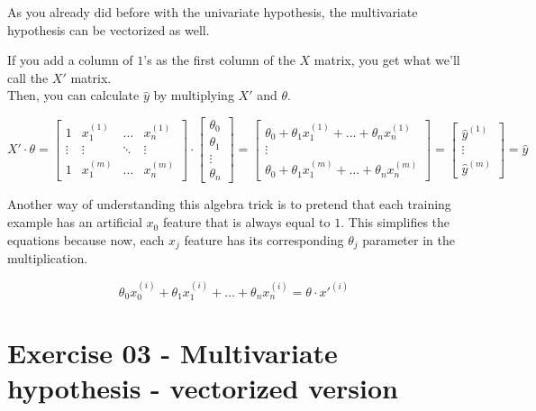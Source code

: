 \documentclass[]{article}
\begin{document}
As you already did before with the univariate hypothesis, the
multivariate hypothesis can be vectorized as well.

If you add a column of \(1\)'s as the first column of the \(X\) matrix,
you get what we'll call the \(X'\) matrix.\\
Then, you can calculate \(\hat{y}\) by multiplying \(X'\) and
\(\theta\).

\large

\[
X' \cdot \theta = 
\begin{bmatrix} 
1 & x_{1}^{(1)} & \dots & x_{n}^{(1)}\\
\vdots & \vdots & \ddots & \vdots\\
1 & x_{1}^{(m)} & \dots &  x_{n}^{(m)}\end{bmatrix}
\cdot
\begin{bmatrix}
\theta_0 \\ 
\theta_1 \\
\vdots \\
\theta_n
\end{bmatrix} 
= 
\begin{bmatrix} 
\theta_0 + \theta_{1} x_{1}^{(1)} + \dots + \theta_{n} x_{n}^{(1)}\\ 
\vdots \\ 
\theta_0 + \theta_{1} x_{1}^{(m)} + \dots + \theta_{n} x_{n}^{(m)}
\end{bmatrix}
=
\begin{bmatrix}
\hat{y}^{(1)} \\ 
\vdots \\
\hat{y}^{(m)}
\end{bmatrix} 
=
\hat{y}
\] \normalsize

Another way of understanding this algebra trick is to pretend that each
training example has an artificial \(x_0\) feature that is always equal
to \(1\). This simplifies the equations because now, each \(x_j\)
feature has its corresponding \(\theta_j\) parameter in the
multiplication.

\large

\[
\theta_0x_0^{(i)} + \theta_{1} x_{1}^{(i)} + \dots + \theta_{n} x_{n}^{(i)} = \theta \cdot x'^{(i)}
\] \normalsize \clearpage

\hypertarget{exercise-03---multivariate-hypothesis---vectorized-version-1}{%
\section{Exercise 03 - Multivariate hypothesis - vectorized
version}\label{exercise-03---multivariate-hypothesis---vectorized-version-1}}
\end{document}
